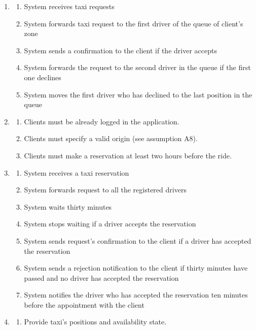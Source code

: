 \documentclass[a4paper]{article}
\begin{document}
\begin{enumerate}[label=\bfseries G\arabic*:]
\begin{enumerate}[label=\bfseries R\arabic*:]
        \end{enumerate}
    \item 
        \begin{enumerate}[label=\bfseries R\arabic*:]
        \item System receives taxi requests
        \item System forwards taxi request to the first driver of the queue of client's zone
        \item System sends a confirmation to the client if the driver accepts
        \item System forwards the request to the second driver in the queue if the first one declines
        \item System moves the first driver who has declined to the last position in the queue
        \end{enumerate}
    \item
        \begin{enumerate}[label=\bfseries R\arabic*:]
        \item Clients must be already logged in the application.
        \item Clients must specify a valid origin (see assumption A8).
        \item Clients must make a reservation at least two hours before the ride.
        \end{enumerate}
    \item
        \begin{enumerate}[label=\bfseries R\arabic*:]
        \item System receives a taxi reservation
        \item System forwards request to all the registered drivers
        \item System waits thirty minutes
        \item System stops waiting if a driver accepts the reservation
        \item System sends request's confirmation to the client if a driver has accepted the reservation
        \item System sends a rejection notification to the client if thirty minutes have passed and no driver has accepted the reservation
        \item System notifies the driver who has accepted the reservation ten minutes before the appointment with the client
        \end{enumerate}
    \item
        \begin{enumerate}[label=\bfseries R\arabic*:]
        \item Provide taxi's positions and availability state.
        \end{enumerate}
\end{enumerate}
\end{document}
